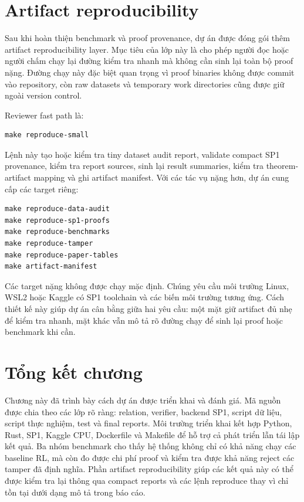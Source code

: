 \documentclass[12pt,a4paper,oneside]{report}
\begin{document}
\section{Artifact reproducibility}

Sau khi hoàn thiện benchmark và proof provenance, dự án được đóng gói thêm artifact reproducibility layer. Mục tiêu của lớp này là cho phép người đọc hoặc người chấm chạy lại đường kiểm tra nhanh mà không cần sinh lại toàn bộ proof nặng. Đường chạy này đặc biệt quan trọng vì proof binaries không được commit vào repository, còn raw datasets và temporary work directories cũng được giữ ngoài version control.

Reviewer fast path là:

\begin{verbatim}
make reproduce-small
\end{verbatim}

Lệnh này tạo hoặc kiểm tra tiny dataset audit report, validate compact SP1 provenance, kiểm tra report sources, sinh lại result summaries, kiểm tra theorem-artifact mapping và ghi artifact manifest. Với các tác vụ nặng hơn, dự án cung cấp các target riêng:

\begin{verbatim}
make reproduce-data-audit
make reproduce-sp1-proofs
make reproduce-benchmarks
make reproduce-tamper
make reproduce-paper-tables
make artifact-manifest
\end{verbatim}

Các target nặng không được chạy mặc định. Chúng yêu cầu môi trường Linux, WSL2 hoặc Kaggle có SP1 toolchain và các biến môi trường tương ứng. Cách thiết kế này giúp dự án cân bằng giữa hai yêu cầu: một mặt giữ artifact đủ nhẹ để kiểm tra nhanh, mặt khác vẫn mô tả rõ đường chạy để sinh lại proof hoặc benchmark khi cần.

\section{Tổng kết chương}

Chương này đã trình bày cách dự án được triển khai và đánh giá. Mã nguồn được chia theo các lớp rõ ràng: relation, verifier, backend SP1, script dữ liệu, script thực nghiệm, test và final reports. Môi trường triển khai kết hợp Python, Rust, SP1, Kaggle CPU, Dockerfile và Makefile để hỗ trợ cả phát triển lẫn tái lập kết quả. Ba nhóm benchmark cho thấy hệ thống không chỉ có khả năng chạy các baseline RL, mà còn đo được chi phí proof và kiểm tra được khả năng reject các tamper đã định nghĩa. Phần artifact reproducibility giúp các kết quả này có thể được kiểm tra lại thông qua compact reports và các lệnh reproduce thay vì chỉ tồn tại dưới dạng mô tả trong báo cáo.
\end{document}
